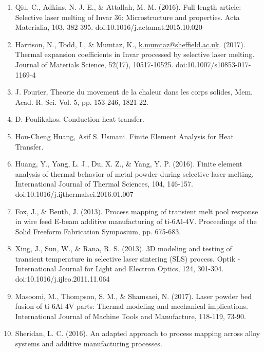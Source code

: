 \documentclass[10pt]{article}
\begin{document}
\begin{enumerate}
  \item Qiu, C., Adkins, N. J. E., \& Attallah, M. M. (2016). Full length article: Selective laser melting of Invar 36: Microstructure and properties. Acta Materialia, 103, 382-395. doi:10.1016/j.actamat.2015.10.020

  \item Harrison, N., Todd, I., \& Mumtaz, K., \href{mailto:k.mumtaz@sheffield.ac.uk}{k.mumtaz@sheffield.ac.uk}. (2017). Thermal expansion coefficients in Invar processed by selective laser melting. Journal of Materials Science, 52(17), 10517-10525. doi:10.1007/s10853-017-1169-4

  \item J. Fourier, Theorie du movement de la chaleur dans les corps solides, Mem. Acad. R. Sci. Vol. 5, pp. 153-246, 1821-22.

  \item D. Poulikakos. Conduction heat transfer.

  \item Hou-Cheng Huang, Asif S. Usmani. Finite Element Analysis for Heat Transfer.

  \item Huang, Y., Yang, L. J., Du, X. Z., \& Yang, Y. P. (2016). Finite element analysis of thermal behavior of metal powder during selective laser melting. International Journal of Thermal Sciences, 104, 146-157. doi:10.1016/j.ijthermalsci.2016.01.007

  \item Fox, J., \& Beuth, J. (2013). Process mapping of transient melt pool response in wire feed E-beam additive manufacturing of ti-6Al-4V. Proceedings of the Solid Freeform Fabrication Symposium, pp. 675-683.

  \item Xing, J., Sun, W., \& Rana, R. S. (2013). 3D modeling and testing of transient temperature in selective laser sintering (SLS) process. Optik - International Journal for Light and Electron Optics, 124, 301-304. doi:10.1016/j.ijleo.2011.11.064

  \item Masoomi, M., Thompson, S. M., \& Shamsaei, N. (2017). Laser powder bed fusion of ti-6Al-4V parts: Thermal modeling and mechanical implications. International Journal of Machine Tools and Manufacture, 118-119, 73-90.

  \item Sheridan, L. C. (2016). An adapted approach to process mapping across alloy systems and additive manufacturing processes.


\end{enumerate}
\end{document}
